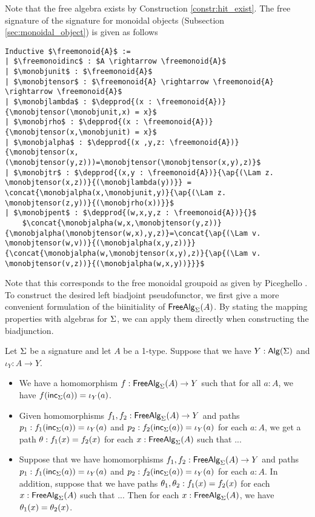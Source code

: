 Note that the free algebra exists by Construction \ref{constr:hit_exist}.
The free signature of the signature for monoidal objects (Subsection \ref{sec:monoidal_object}) is given as follows

\begin{lstlisting}[mathescape=true]
Inductive $\freemonoid{A}$ :=
| $\freemonoidinc$ : $A \rightarrow \freemonoid{A}$
| $\monobjunit$ : $\freemonoid{A}$
| $\monobjtensor$ : $\freemonoid{A} \rightarrow \freemonoid{A} \rightarrow \freemonoid{A}$
| $\monobjlambda$ : $\depprod{(x : \freemonoid{A})}{\monobjtensor(\monobjunit,x) = x}$
| $\monobjrho$ : $\depprod{(x : \freemonoid{A})}{\monobjtensor(x,\monobjunit) = x}$
| $\monobjalpha$ : $\depprod{(x ,y,z: \freemonoid{A})}{\monobjtensor(x,(\monobjtensor(y,z)))=\monobjtensor(\monobjtensor(x,y),z)}$
| $\monobjtr$ : $\depprod{(x,y : \freemonoid{A})}{\ap{(\Lam z. \monobjtensor(x,z))}{(\monobjlambda(y))}} = \concat{\monobjalpha(x,\monobjunit,y)}{\ap{(\Lam z. \monobjtensor(z,y))}{(\monobjrho(x))}}$
| $\monobjpent$ : $\depprod{(w,x,y,z : \freemonoid{A})}{}$
    $\concat{\monobjalpha(w,x,\monobjtensor(y,z))}{\monobjalpha(\monobjtensor(w,x),y,z)}=\concat{\ap{(\Lam v. \monobjtensor(w,v))}{(\monobjalpha(x,y,z))}}{\concat{\monobjalpha(w,\monobjtensor(x,y),z)}{\ap{(\Lam v. \monobjtensor(v,z))}{(\monobjalpha(w,x,y))}}}$
\end{lstlisting}

Note that this corresponds to the free monoidal groupoid as given by Piceghello \cite{piceghello2019}.
To construct the desired left biadjoint pseudofunctor, we first give a more convenient formulation of the biinitiality of $\mathsf{FreeAlg}_{\Sigma}(A)$.
By stating the mapping properties with algebras for $\Sigma$, we can apply them directly when constructing the biadjunction.

\begin{corollary}
Let $\Sigma$ be a signature and let $A$ be a 1-type.
Suppose that we have $Y : \mathsf{Alg}(\Sigma)$ and $\iota_Y : A \rightarrow Y$.
\begin{itemize}
	\item We have a homomorphism $f : \mathsf{FreeAlg}_{\Sigma}(A) \rightarrow Y$ such that for all $a : A$, we have $f(\mathsf{inc}_{\Sigma}(a)) = \iota_Y(a)$.
	\item
	Given homomorphisms $f_1, f_2 : \mathsf{FreeAlg}_{\Sigma}(A) \rightarrow Y$
	and paths $p_1 : f_1(\mathsf{inc}_{\Sigma}(a)) = \iota_Y(a)$ and $p_2 : f_2(\mathsf{inc}_{\Sigma}(a)) = \iota_Y(a)$ for each $a : A$,
	we get a path $\theta : f_1(x) = f_2(x)$ for each $x : \mathsf{FreeAlg}_{\Sigma}(A)$
	such that ...
	\item
	Suppose that we have homomorphisms $f_1, f_2 : \mathsf{FreeAlg}_{\Sigma}(A) \rightarrow Y$
	and paths $p_1 : f_1(\mathsf{inc}_{\Sigma}(a)) = \iota_Y(a)$ and $p_2 : f_2(\mathsf{inc}_{\Sigma}(a)) = \iota_Y(a)$ for each $a : A$.
	In addition, suppose that we have paths $\theta_1, \theta_2 : f_1(x) = f_2(x)$ for each $x : \mathsf{FreeAlg}_{\Sigma}(A)$
	such that ...
	Then for each $x : \mathsf{FreeAlg}_{\Sigma}(A)$, we have $\theta_1(x) = \theta_2(x)$.
\end{itemize} 
\end{corollary}

